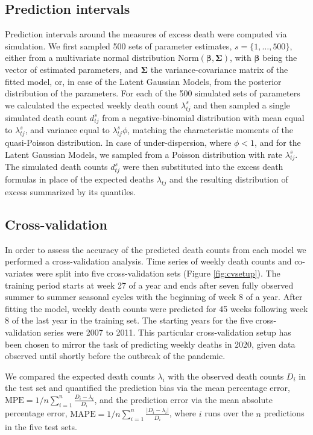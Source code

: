 \documentclass[12pt]{article}
\begin{document}
\subsection*{Prediction intervals}

Prediction intervals around the measures of excess death were computed via simulation. We first sampled 500 sets of parameter estimates, $s=\{1,\ldots,500\}$, either from a multivariate normal distribution $\text{Norm}(\boldsymbol{\beta}, \boldsymbol{\Sigma})$, with $\boldsymbol{\beta}$ being the vector of estimated parameters, and $\boldsymbol{\Sigma}$ the variance-covariance matrix of the fitted model, or, in case of the Latent Gaussian Models, from the posterior distribution of the parameters. For each of the 500 simulated sets of parameters we calculated the expected weekly death count $\lambda_{tj}^s$ and then sampled a single simulated death count $d_{tj}^s$ from a negative-binomial distribution with mean equal to $\lambda_{tj}^s$, and variance equal to $\lambda_{tj}^s\phi$, matching the characteristic moments of the quasi-Poisson distribution. In case of under-dispersion, where $\phi<1$, and for the Latent Gaussian Models, we sampled from a Poisson distribution with rate $\lambda_{tj}^s$. The simulated death counts $d_{tj}^s$ were then substituted into the excess death formulas in place of the expected deaths $\lambda_{tj}$ and the resulting distribution of excess summarized by its quantiles.

\subsection*{Cross-validation}

In order to assess the accuracy of the predicted death counts from each model we performed a cross-validation analysis. Time series of weekly death counts and co-variates were split into five cross-validation sets (Figure \ref{fig:cvsetup}). The training period starts at week 27 of a year and ends after seven fully observed summer to summer seasonal cycles with the beginning of week 8 of a year. After fitting the model, weekly death counts were predicted for 45 weeks following week 8 of the last year in the training set. The starting years for the five cross-validation series were 2007 to 2011. This particular cross-validation setup has been chosen to mirror the task of predicting weekly deaths in 2020, given data observed until shortly before the outbreak of the pandemic.

We compared the expected death counts $\lambda_i$ with the observed death counts $D_i$ in the test set and quantified the prediction bias via the mean percentage error, $\text{MPE} = 1/n\sum_{i=1}^n \frac {D_i - \lambda_i} {D_i}$, and the prediction error via the mean absolute percentage error, $\text{MAPE} = 1/n\sum_{i=1}^n\frac {|D_i - \lambda_i|} {D_i}$, where $i$ runs over the $n$ predictions in the five test sets.
\end{document}
